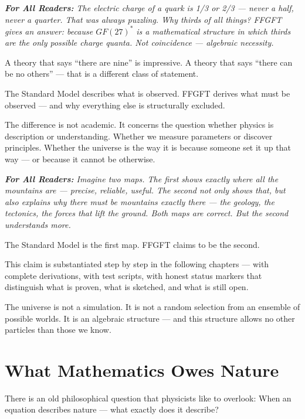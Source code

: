 \documentclass[11pt,oneside]{book}
\newenvironment{laierspur}{%
  \par\vspace{4pt}%
  \noindent\small\itshape\color{blue!60!black}%
  \textbf{For All Readers:}\enspace\ignorespaces}{%
  \par\vspace{4pt}\normalsize\normalfont\normalcolor}
\begin{document}
\begin{laierspur}
The electric charge of a quark is 1/3 or 2/3 — never a half, never a
quarter. That was always puzzling. Why thirds of all things? FFGFT gives an
answer: because $GF(27)^*$ is a mathematical structure in which thirds are the
only possible charge quanta. Not coincidence — algebraic necessity.
\end{laierspur}

A theory that says \enquote{there are nine} is impressive. A theory that says \enquote{there
can be no others} — that is a different class of statement.

The Standard Model describes what is observed. FFGFT derives what must be
observed — and why everything else is structurally excluded.

The difference is not academic. It concerns the question whether physics is
description or understanding. Whether we measure parameters or discover
principles. Whether the universe is the way it is because someone set it up
that way — or because it cannot be otherwise.

\begin{laierspur}
Imagine two maps. The first shows exactly where all the mountains are —
precise, reliable, useful. The second not only shows that, but also explains
why there must be mountains exactly there — the geology, the tectonics, the
forces that lift the ground. Both maps are correct. But the second
understands more.
\end{laierspur}

The Standard Model is the first map. FFGFT claims to be the second.

This claim is substantiated step by step in the following chapters — with
complete derivations, with test scripts, with honest status markers that
distinguish what is proven, what is sketched, and what is still open.

The universe is not a simulation. It is not a random selection from an
ensemble of possible worlds. It is an algebraic structure — and this
structure allows no other particles than those we know.


\chapter{What Mathematics Owes Nature}

There is an old philosophical question that physicists like to overlook:
When an equation describes nature — what exactly does it describe?
\end{document}
